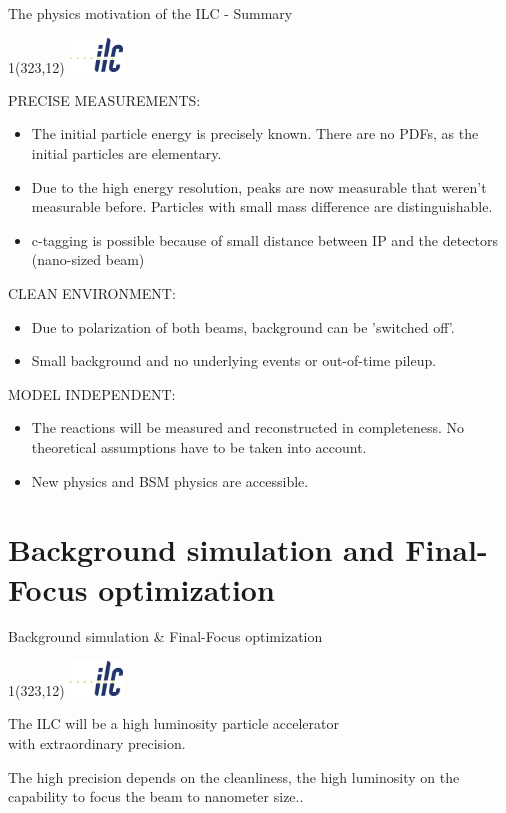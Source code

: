 \documentclass[xcolor={dvipsnames}]{beamer}
\newcommand{\ilclogo}{
  \setlength{\TPHorizModule}{1pt}
  \setlength{\TPVertModule}{1pt}
  \begin{textblock}{1}(323,12)
   \includegraphics[width=40pt,height=26pt]{figures/ILC.jpeg}
  \end{textblock}
}
\begin{document}
\begin{frame}{The physics motivation of the ILC - Summary}
\ilclogo
\alert{\MakeUppercase{Precise measurements:}}\\
\begin{itemize}
\item The initial particle energy is precisely known. There are no PDFs, as the initial particles are elementary.
\item Due to the high energy resolution, peaks are now measurable that weren't measurable before. Particles with small mass difference are distinguishable.
\item c-tagging is possible because of small distance between IP and the  detectors (nano-sized beam)
\end{itemize}
\alert{\MakeUppercase{Clean environment:}}\\
\begin{itemize}
\item Due to polarization of both beams, background can be 'switched off'.
\item Small background and no underlying events or out-of-time pileup.
\end{itemize}
\alert{\MakeUppercase{Model independent:}}\\
\begin{itemize}
\item The reactions will be measured and reconstructed in completeness. No theoretical assumptions have to be taken into account.
\item New physics and BSM physics are accessible.
\end{itemize}

\end{frame}

\section{Background simulation and Final-Focus optimization}
\begin{frame}{Background simulation \& Final-Focus optimization}
\ilclogo
\begin{block}{}
\centering The ILC will be a \textcolor{Periwinkle}{high luminosity} particle accelerator \\with \textcolor{JungleGreen}{extraordinary precision}.
\end{block}
\vspace*{1cm}
\textcolor{JungleGreen}{The high precision depends on the cleanliness}, \textcolor{Periwinkle}{the high luminosity on the capability to focus the beam to nanometer size.}.\\
\vspace*{0.5cm}
\end{frame}
\end{document}
